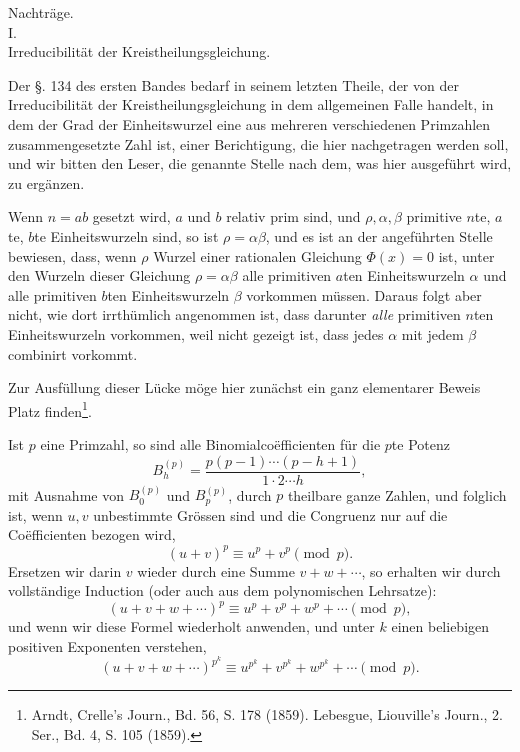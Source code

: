 \documentclass[11pt]{article}
\begin{document}
\begin{center}
{\Large Nachträge.}\\[1em]
{\large I.}\\[0.5em]
{\large Irreducibilität der Kreistheilungsgleichung.}
\end{center}

Der §. 134 des ersten Bandes bedarf in seinem letzten Theile, der von der Irreducibilität der Kreistheilungsgleichung in dem allgemeinen Falle handelt, in dem der Grad der Einheitswurzel eine aus mehreren verschiedenen Primzahlen zusammengesetzte Zahl ist, einer Berichtigung, die hier nachgetragen werden soll, und wir bitten den Leser, die genannte Stelle nach dem, was hier ausgeführt wird, zu ergänzen.

Wenn $n=ab$ gesetzt wird, $a$ und $b$ relativ prim sind, und $\rho,\alpha,\beta$ primitive $n$te, $a$te, $b$te Einheitswurzeln sind, so ist $\rho=\alpha\beta$, und es ist an der angeführten Stelle bewiesen, dass, wenn $\rho$ Wurzel einer rationalen Gleichung $\Phi(x)=0$ ist, unter den Wurzeln dieser Gleichung $\rho=\alpha\beta$ alle primitiven $a$ten Einheitswurzeln $\alpha$ und alle primitiven $b$ten Einheitswurzeln $\beta$ vorkommen müssen. Daraus folgt aber nicht, wie dort irrthümlich angenommen ist, dass darunter \emph{alle} primitiven $n$ten Einheitswurzeln vorkommen, weil nicht gezeigt ist, dass jedes $\alpha$ mit jedem $\beta$ combinirt vorkommt.

Zur Ausfüllung dieser Lücke möge hier zunächst ein ganz elementarer Beweis Platz finden\footnote{Arndt, Crelle's Journ., Bd. 56, S. 178 (1859). Lebesgue, Liouville's Journ., 2. Ser., Bd. 4, S. 105 (1859).}.

Ist $p$ eine Primzahl, so sind alle Binomialcoëfficienten für die $p$te Potenz
\[
B_h^{(p)}=\frac{p(p-1)\cdots(p-h+1)}{1\cdot2\cdots h},
\]
mit Ausnahme von $B_0^{(p)}$ und $B_p^{(p)}$, durch $p$ theilbare ganze Zahlen,
und folglich ist, wenn $u,v$ unbestimmte Grössen sind und die Congruenz nur auf die Coëfficienten bezogen wird,
\[
(u+v)^p\equiv u^p+v^p \pmod p.
\]
Ersetzen wir darin $v$ wieder durch eine Summe $v+w+\cdots$, so erhalten wir durch vollständige Induction (oder auch aus dem polynomischen Lehrsatze):
\[
(u+v+w+\cdots)^p\equiv u^p+v^p+w^p+\cdots \pmod p,
\]
und wenn wir diese Formel wiederholt anwenden, und unter $k$ einen beliebigen positiven Exponenten verstehen,
\begin{equation}\tag{1}
(u+v+w+\cdots)^{p^k}\equiv u^{p^k}+v^{p^k}+w^{p^k}+\cdots \pmod p.
\end{equation}
\end{document}
